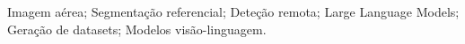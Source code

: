 \acresetall

\noindent Imagem aérea; Segmentação referencial; Deteção remota; Large Language Models; Geração de datasets; Modelos visão-linguagem.